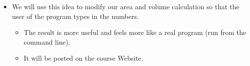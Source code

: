 \documentclass[letterpaper,10pt,english]{sphinxmanual}
\begin{document}
\begin{itemize}
\begin{sphinxVerbatim}[commandchars=\\\{\}]
  
  
\end{sphinxVerbatim}

\item {} 
We will use this idea to modify our area and volume calculation so
that the user of the program types in the numbers.
\begin{itemize}
\item {} 
The result is more useful and feels more like a real program
(run from the command line).

\item {} 
It will be posted on the course Website.

\end{itemize}

\end{itemize}
\end{document}
